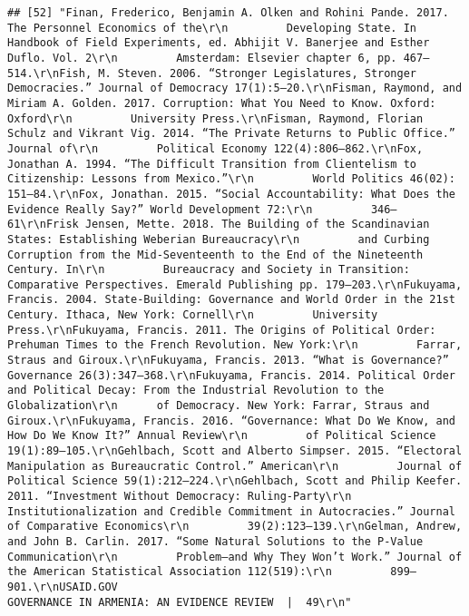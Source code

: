 \documentclass[
]{article}
\begin{document}
\begin{verbatim}
## [52] "Finan, Frederico, Benjamin A. Olken and Rohini Pande. 2017. The Personnel Economics of the\r\n         Developing State. In Handbook of Field Experiments, ed. Abhijit V. Banerjee and Esther Duflo. Vol. 2\r\n         Amsterdam: Elsevier chapter 6, pp. 467–514.\r\nFish, M. Steven. 2006. “Stronger Legislatures, Stronger Democracies.” Journal of Democracy 17(1):5–20.\r\nFisman, Raymond, and Miriam A. Golden. 2017. Corruption: What You Need to Know. Oxford: Oxford\r\n         University Press.\r\nFisman, Raymond, Florian Schulz and Vikrant Vig. 2014. “The Private Returns to Public Office.” Journal of\r\n         Political Economy 122(4):806–862.\r\nFox, Jonathan A. 1994. “The Difficult Transition from Clientelism to Citizenship: Lessons from Mexico.”\r\n         World Politics 46(02): 151–84.\r\nFox, Jonathan. 2015. “Social Accountability: What Does the Evidence Really Say?” World Development 72:\r\n         346–61\r\nFrisk Jensen, Mette. 2018. The Building of the Scandinavian States: Establishing Weberian Bureaucracy\r\n         and Curbing Corruption from the Mid-Seventeenth to the End of the Nineteenth Century. In\r\n         Bureaucracy and Society in Transition: Comparative Perspectives. Emerald Publishing pp. 179–203.\r\nFukuyama, Francis. 2004. State-Building: Governance and World Order in the 21st Century. Ithaca, New York: Cornell\r\n         University Press.\r\nFukuyama, Francis. 2011. The Origins of Political Order: Prehuman Times to the French Revolution. New York:\r\n         Farrar, Straus and Giroux.\r\nFukuyama, Francis. 2013. “What is Governance?” Governance 26(3):347–368.\r\nFukuyama, Francis. 2014. Political Order and Political Decay: From the Industrial Revolution to the Globalization\r\n      of Democracy. New York: Farrar, Straus and Giroux.\r\nFukuyama, Francis. 2016. “Governance: What Do We Know, and How Do We Know It?” Annual Review\r\n         of Political Science 19(1):89–105.\r\nGehlbach, Scott and Alberto Simpser. 2015. “Electoral Manipulation as Bureaucratic Control.” American\r\n         Journal of Political Science 59(1):212–224.\r\nGehlbach, Scott and Philip Keefer. 2011. “Investment Without Democracy: Ruling-Party\r\n         Institutionalization and Credible Commitment in Autocracies.” Journal of Comparative Economics\r\n         39(2):123–139.\r\nGelman, Andrew, and John B. Carlin. 2017. “Some Natural Solutions to the P-Value Communication\r\n         Problem—and Why They Won’t Work.” Journal of the American Statistical Association 112(519):\r\n         899–901.\r\nUSAID.GOV                                                         GOVERNANCE IN ARMENIA: AN EVIDENCE REVIEW  |  49\r\n"                                                                                                                                                                                                                                                                                                                                                                                                                                                                                                                                                                                                                                                                         
\end{verbatim}
\end{document}
